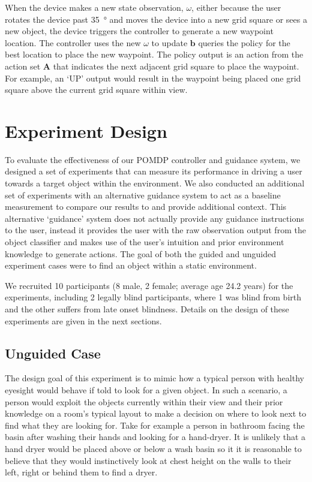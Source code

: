 \documentclass[runningheads]{llncs}
\begin{document}
When the device makes a new state observation, $\omega$, either because the user rotates the device past \SI{35}{\degree} and moves the device into a new grid square or sees a new object, the device triggers the controller to generate a new waypoint location.
The controller uses the new $\omega$ to update $\mathbf{b}$ queries the policy for the best location to place the new waypoint. 
The policy output is an action from the action set $\mathbf{A}$ that indicates the next adjacent grid square to place the waypoint.
For example, an `UP' output would result in the waypoint being placed one grid square above the current grid square within view. 

\section{Experiment Design}\label{sec:experiments}

To evaluate the effectiveness of our POMDP controller and guidance system, we designed a set of experiments that can measure its performance in driving a user towards a target object within the environment. 
We also conducted an additional set of experiments with an alternative guidance system to act as a baseline measurement to compare our results to and provide additional context. 
This alternative `guidance' system does not actually provide any guidance instructions to the user, instead it provides the user with the raw observation output from the object classifier and makes use of the user's intuition and prior environment knowledge to generate actions. 
The goal of both the guided and unguided experiment cases were to find an object within a static environment. 

We recruited 10 participants (8 male, 2 female; average age 24.2 years) for the experiments, including 2 legally blind participants, where 1 was blind from birth and the other suffers from late onset blindness.
Details on the design of these experiments are given in the next sections. 

\subsection{Unguided Case}

The design goal of this experiment is to mimic how a typical person with healthy eyesight would behave if told to look for a given object. 
In such a scenario, a person would exploit the objects currently within their view and their prior knowledge on a room's typical layout to make a decision on where to look next to find what they are looking for. 
Take for example a person in bathroom facing the basin after washing their hands and looking for a hand-dryer. 
It is unlikely that a hand dryer would be placed above or below a wash basin so it it is reasonable to believe that they would instinctively look at chest height on the walls to their left, right or behind them to find a dryer. 
\end{document}
